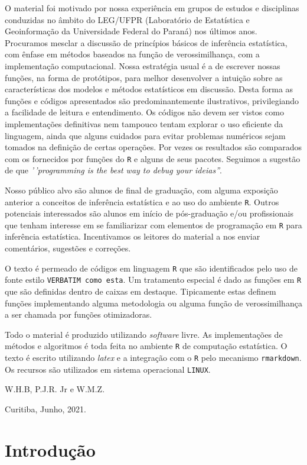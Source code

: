 \documentclass[
  9pt,
  a5paper,
]{book}
\theoremstyle{definition}
\theoremstyle{definition}
\theoremstyle{definition}
\theoremstyle{definition}
\theoremstyle{remark}
\begin{document}
O material foi motivado por nossa experiência em grupos de estudos e
disciplinas conduzidas no âmbito do LEG/UFPR
(Laboratório de Estatística e Geoinformação da Universidade Federal do Paraná)
nos últimos anos. Procuramos mesclar a discussão de princípios básicos de
inferência estatística, com ênfase em métodos baseados na função de verossimilhança,
com a implementação computacional.
Nossa estratégia usual é a de escrever nossas funções, na forma de protótipos, para
melhor desenvolver a intuição sobre as características dos modelos e métodos estatísticos em discussão.
Desta forma as funções e códigos apresentados são predominantemente ilustrativos,
privilegiando a facilidade de leitura e entendimento.
Os códigos não devem ser vistos como implementações definitivas nem tampouco
tentam explorar o uso eficiente da linguagem, ainda que alguns cuidados
para evitar problemas numéricos sejam tomados na definição de certas operações.
Por vezes os resultados são comparados com os fornecidos por funções do \texttt{R} e alguns de seus pacotes.
Seguimos a sugestão de que \emph{'\,'programming is the best way to debug your ideias''}.

Nosso público alvo são alunos de final de graduação, com alguma exposição anterior a conceitos de inferência estatística e ao uso do ambiente \texttt{R}.
Outros potenciais interessados são alunos em
início de pós-graduação e/ou profissionais que tenham interesse em se familiarizar
com elementos de programação em \texttt{R} para inferência estatística.
Incentivamos os leitores do material a nos enviar comentários, sugestões e correções.

O texto é permeado de códigos em linguagem \texttt{R} que são identificados pelo uso de fonte
estilo \texttt{VERBATIM\ como\ esta}.
Um tratamento especial é dado as funções em \texttt{R} que são definidas dentro de caixas em destaque.
Tipicamente estas definem funções implementando alguma metodologia ou
alguma função de verossimilhança a ser chamada por funções otimizadoras.

Todo o material é produzido utilizando \emph{software} livre.
As implementações de métodos e algoritmos é toda feita no ambiente \texttt{R}
de computação estatística. O texto é escrito utilizando \emph{latex} e a integração
com o \texttt{R} pelo mecanismo \texttt{rmarkdown}.
Os recursos são utilizados em sistema operacional \texttt{LINUX}.

W.H.B, P.J.R. Jr e W.M.Z.

Curitiba, Junho, 2021.

\hypertarget{introduuxe7uxe3o}{%
\chapter{Introdução}\label{introduuxe7uxe3o}}
\end{document}
